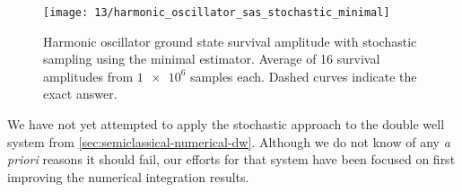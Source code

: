 \begin{figure}
	\centering
	\texttt{[image: 13/harmonic\_oscillator\_sas\_stochastic\_minimal]}
	\caption[
		Harmonic oscillator survival amplitude using minimal estimator
	]{
		Harmonic oscillator ground state survival amplitude with stochastic sampling using the minimal estimator.
		Average of 16 survival amplitudes from $\num{1e6}$ samples each.
		Dashed curves indicate the exact answer.
	}
	\label{fig:harmonic-oscillator-survival-minimal}
\end{figure}

We have not yet attempted to apply the stochastic approach to the double well system from \cref{sec:semiclassical-numerical-dw}.
Although we do not know of any \textit{a priori} reasons it should fail, our efforts for that system have been focused on first improving the numerical integration results.
